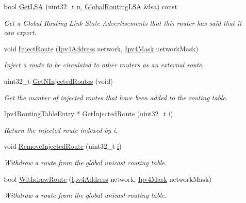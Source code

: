\begin{DoxyCompactItemize}
bool \hyperlink{classns3_1_1GlobalRouter_a1ae9d137fabd4fa16b6bc7b292bbadd3}{Get\+L\+SA} (uint32\+\_\+t \hyperlink{lte__link__budget__x2__handover__measures_8m_abdb05bc5a064cf642a06c83b3392f148}{n}, \hyperlink{classns3_1_1GlobalRoutingLSA}{Global\+Routing\+L\+SA} \&lsa) const 
\begin{DoxyCompactList}\small\item\em Get a Global Routing Link State Advertisements that this router has said that it can export. \end{DoxyCompactList}\item 
void \hyperlink{classns3_1_1GlobalRouter_a393647cfce742040c6adab116777695f}{Inject\+Route} (\hyperlink{classns3_1_1Ipv4Address}{Ipv4\+Address} network, \hyperlink{classns3_1_1Ipv4Mask}{Ipv4\+Mask} network\+Mask)
\begin{DoxyCompactList}\small\item\em Inject a route to be circulated to other routers as an external route. \end{DoxyCompactList}\item 
uint32\+\_\+t \hyperlink{classns3_1_1GlobalRouter_a5b28018cadfa511cc9d5b58506f65321}{Get\+N\+Injected\+Routes} (void)
\begin{DoxyCompactList}\small\item\em Get the number of injected routes that have been added to the routing table. \end{DoxyCompactList}\item 
\hyperlink{classns3_1_1Ipv4RoutingTableEntry}{Ipv4\+Routing\+Table\+Entry} $\ast$ \hyperlink{classns3_1_1GlobalRouter_a7fa5ef8dea5f91441b394cb4fa752112}{Get\+Injected\+Route} (uint32\+\_\+t \hyperlink{lte__uplink__power__control_8m_a6f6ccfcf58b31cb6412107d9d5281426}{i})
\begin{DoxyCompactList}\small\item\em Return the injected route indexed by i. \end{DoxyCompactList}\item 
void \hyperlink{classns3_1_1GlobalRouter_aa8a781b1a62792f28d1962d7c0f4a0ee}{Remove\+Injected\+Route} (uint32\+\_\+t \hyperlink{lte__uplink__power__control_8m_a6f6ccfcf58b31cb6412107d9d5281426}{i})
\begin{DoxyCompactList}\small\item\em Withdraw a route from the global unicast routing table. \end{DoxyCompactList}\item 
bool \hyperlink{classns3_1_1GlobalRouter_a17da2fda3c801645ccaed838a8d2e553}{Withdraw\+Route} (\hyperlink{classns3_1_1Ipv4Address}{Ipv4\+Address} network, \hyperlink{classns3_1_1Ipv4Mask}{Ipv4\+Mask} network\+Mask)
\begin{DoxyCompactList}\small\item\em Withdraw a route from the global unicast routing table. \end{DoxyCompactList}\end{DoxyCompactItemize}
